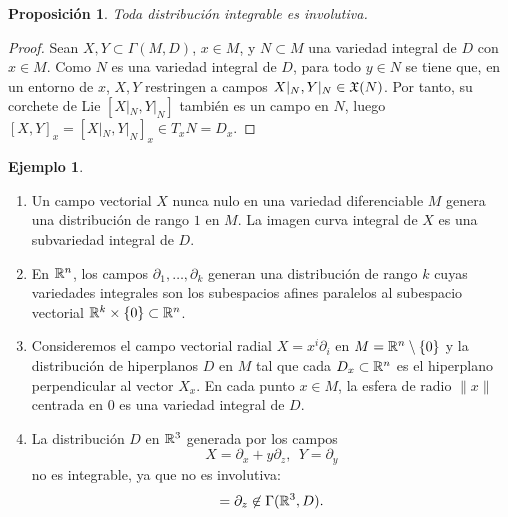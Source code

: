 \documentclass[11pt,a4paper]{amsbook}
\newtheorem{prop}[subsection]{Proposición}
\theoremstyle{remark} \newtheorem{rmk}[subsection]{Observación}
\theoremstyle{definition} \newtheorem{defn}[subsection]{Definición}
\theoremstyle{definition} \newtheorem{ex}[subsection]{Ejemplo}
\theoremstyle{definition} \newtheorem{ej}[subsection]{Ejercicio}
\begin{document}
\begin{prop}
Toda distribución integrable es involutiva.
\end{prop}

\begin{proof}
Sean $X,Y \subset \Gamma(M,D)$, $x\in M$, y $N\subset M$ una variedad integral de $D$ con $x\in M$. Como $N$ es una variedad integral de $D$, para todo $y\in N$ se tiene que, en un entorno de $x$, $X,Y$ restringen a campos $X|_N,Y|_N \in \mathfrak X(N)$. Por tanto, su corchete de Lie $[X|_N,Y|_N]$ también es un campo en $N$, luego $[X,Y]_x = [X|_N,Y|_N]_x \in T_xN=D_x$.
\end{proof}

\begin{ex} \leavevmode
  \begin{enumerate}
  \item Un campo vectorial $X$ nunca nulo en una variedad diferenciable $M$ genera una distribución de rango $1$ en $M$. La imagen curva integral de $X$ es una subvariedad integral de $D$.
  \item En $\mathbb R^n$, los campos $\partial_1,\dots,\partial_k$ generan una distribución de rango $k$ cuyas variedades integrales son los subespacios afines paralelos al subespacio vectorial $\mathbb R^k\times \left\{ 0 \right\}\subset \mathbb R^n$.
  \item Consideremos el campo vectorial radial $X=x^i \partial_i$ en $M=\mathbb R^n \setminus \left\{ 0 \right\}$ y la distribución de hiperplanos $D$ en $M$ tal que cada $D_x\subset \mathbb R^n$ es el hiperplano perpendicular al vector $X_x$. En cada punto $x\in M$, la esfera de radio $\lVert x \rVert$ centrada en $0$ es una variedad integral de $D$.
    \item La distribución $D$ en $\mathbb R^3$ generada por los campos
          \begin{equation*}
X= \partial_x + y \partial_z, \ \ Y=\partial_y
          \end{equation*}
no es integrable, ya que no es involutiva:
          \begin{equation*}
[X,Y] =\partial_z \not\in \Gamma(\RR^3,D).
          \end{equation*}
  \end{enumerate}
\end{ex}
\end{document}
